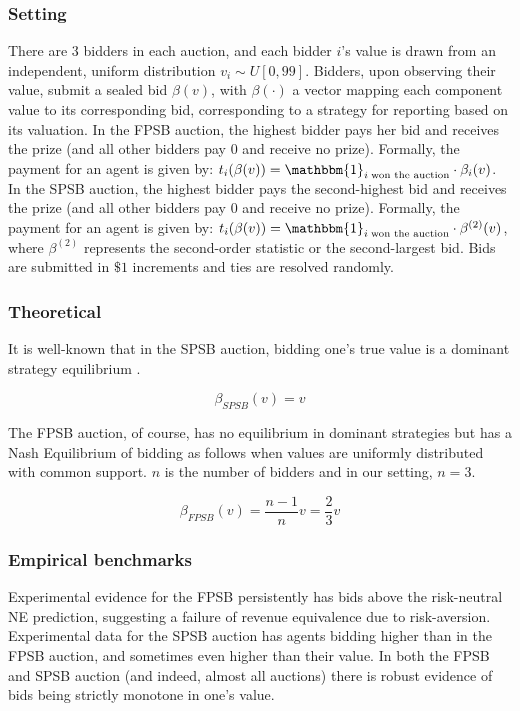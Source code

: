 \documentclass{article} %
\begin{document}
\subsubsection{Setting}
There are $3$ bidders in each auction, and each bidder $i$'s value is drawn from an independent, uniform distribution $v_i \sim U[0, 99]$. Bidders, upon observing their value, submit a sealed bid $\beta(v)$, with $\beta(\cdot)$ a vector mapping each component value to its corresponding bid, corresponding to a strategy for reporting based on its valuation. In the FPSB auction, the highest bidder pays her bid and receives the prize (and all other bidders pay $0$ and receive no prize). Formally, the payment for an agent is given by: $t_i(\beta(v)) = \mathbbm{1}_{i \; \text{won the auction}}\cdot \beta_i(v)$. In the SPSB auction, the highest bidder pays the second-highest bid and receives the prize (and all other bidders pay $0$ and receive no prize). Formally, the payment for an agent is given by: $t_i(\beta(v)) = \mathbbm{1}_{i \; \text{won the auction}} \cdot \beta^{(2)}(v)$, where $\beta^{(2)}$ represents the second-order statistic or the second-largest bid. Bids are submitted in $\$1$ increments and ties are resolved randomly. 

\subsubsection{Theoretical }

It is well-known that in the SPSB auction, bidding one's true value is a dominant strategy equilibrium \cite{krishna2009auction}. 

\begin{equation}
    \beta_{SPSB}(v) = v
\end{equation}

The FPSB auction, of course, has no equilibrium in dominant strategies but has a Nash Equilibrium of bidding as follows when values are uniformly distributed with common support. $n$ is the number of bidders and in our setting, $n=3$.

\begin{equation}
    \beta_{FPSB}(v) =  \frac{n-1}{n} v = \frac{2}{3}v
\end{equation}




\subsubsection{Empirical benchmarks}
Experimental evidence for the FPSB persistently has bids above the risk-neutral NE prediction, suggesting a failure of revenue equivalence due to risk-aversion. Experimental data for the SPSB auction has agents bidding higher than in the FPSB auction, and sometimes even higher than their value. In both the FPSB and SPSB auction (and indeed, almost all auctions) there is robust evidence of bids being strictly monotone in one's value. 
\end{document}
